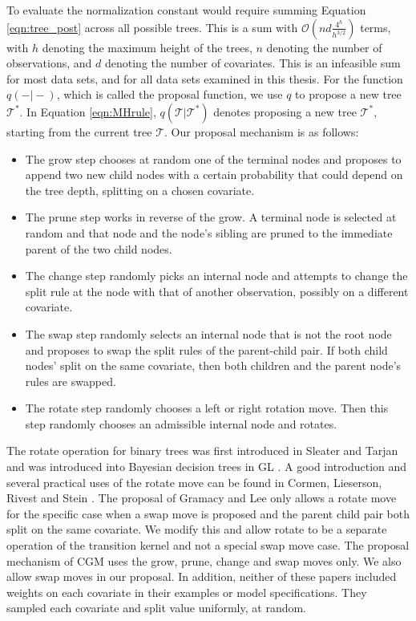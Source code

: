 \documentclass{article}
\begin{document}
To evaluate the normalization constant would require summing Equation \ref{eqn:tree_post} across all possible trees. This is a sum with $\mathcal{O}(nd\frac{4^h}{h^{3/2}})$ terms, with $h$ denoting the maximum height of the trees, $n$ denoting the number of observations, and $d$ denoting the number of covariates. This is an infeasible sum for most data sets, and for all data sets examined in this thesis. For the function $q(-\vert-)$, which is called the proposal function, we use $q$ to propose a new tree $\mathcal{T}^*$.   
In Equation \ref{eqn:MHrule}, $q(\mathcal{T}\vert\mathcal{T}^*)$ denotes proposing a new tree $\mathcal{T}^*$, starting from the current tree $\mathcal{T}$. 
 Our proposal mechanism is as follows:
  \begin{itemize}
 \item The grow step chooses at random one of the terminal nodes and proposes to append two new child nodes with a certain probability that could depend on the tree depth, splitting on a chosen covariate.
 \item The prune step works in reverse of the grow. A terminal node is selected at random and that node and the node's sibling are pruned to the immediate parent of the two child nodes.
 \item The change step randomly picks an internal node and attempts to change the split rule at the node with that of another observation, possibly on a different covariate.
  \item The swap step randomly selects an internal node that is not the root node and proposes to swap the split rules of the parent-child pair. If both child nodes' split on the same covariate, then both children and the parent node's rules are swapped.
  \item The rotate step randomly chooses a left or right rotation move. Then this step randomly chooses an admissible internal node and rotates.
 \end{itemize}
  The rotate operation for binary trees was first introduced in Sleater and Tarjan \cite{sleator1985self} and was introduced into Bayesian decision trees in GL \cite{gramacy2008bayesian}. A good introduction and several practical uses of the rotate move can be found in Cormen, Lieserson, Rivest and Stein \cite{cormen2001introduction}. The proposal of Gramacy and Lee \cite{gramacy2008bayesian} only allows a rotate move for the specific case when a swap move is proposed and the parent child pair both split on the same covariate. We modify this and allow rotate to be a separate operation of the transition kernel and not a special swap move case. The proposal mechanism of CGM uses the grow, prune, change and swap moves only. We also allow swap moves in our proposal. In addition, neither of these papers included weights on each covariate in their examples or model specifications. They sampled each covariate and split value uniformly, at random. 
  
\end{document}
